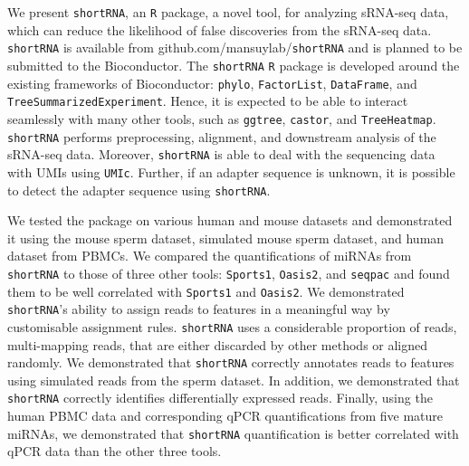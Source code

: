 \documentclass[12pt,twoside]{reedthesis}
\begin{document}
We present \texttt{shortRNA}, an \texttt{R} package, a novel tool, for analyzing
sRNA-seq data, which can reduce the likelihood of false discoveries from
the sRNA-seq data. \texttt{shortRNA} is available from
github.com/mansuylab/\texttt{shortRNA} and is planned to be submitted to the
Bioconductor. The \texttt{shortRNA} \texttt{R} package is developed around the
existing frameworks of Bioconductor: \texttt{phylo}, \texttt{FactorList}, \texttt{DataFrame},
and \texttt{TreeSummarizedExperiment}. Hence, it is expected to be able to
interact seamlessly with many other tools, such as \texttt{ggtree}, \texttt{castor},
and \texttt{TreeHeatmap}. \texttt{shortRNA} performs preprocessing, alignment, and
downstream analysis of the sRNA-seq data. Moreover, \texttt{shortRNA} is able
to deal with the sequencing data with UMIs using \texttt{UMIc}. Further, if an
adapter sequence is unknown, it is possible to detect the adapter
sequence using \texttt{shortRNA}.

We tested the package on various human and mouse datasets and
demonstrated it using the mouse sperm dataset, simulated mouse sperm
dataset, and human dataset from PBMCs. We compared the quantifications
of miRNAs from \texttt{shortRNA} to those of three other tools: \texttt{Sports1},
\texttt{Oasis2}, and \texttt{seqpac} and found them to be well correlated with
\texttt{Sports1} and \texttt{Oasis2}. We demonstrated \texttt{shortRNA}'s ability to assign
reads to features in a meaningful way by customisable assignment rules.
\texttt{shortRNA} uses a considerable proportion of reads, multi-mapping reads,
that are either discarded by other methods or aligned randomly. We
demonstrated that \texttt{shortRNA} correctly annotates reads to features using
simulated reads from the sperm dataset. In addition, we demonstrated
that \texttt{shortRNA} correctly identifies differentially expressed reads.
Finally, using the human PBMC data and corresponding qPCR
quantifications from five mature miRNAs, we demonstrated that \texttt{shortRNA}
quantification is better correlated with qPCR data than the other three
tools.
\end{document}
